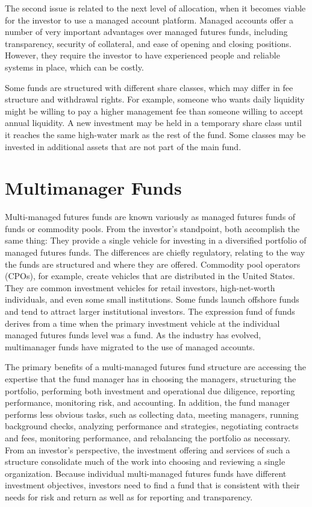\documentclass[11pt]{article}
\begin{document}
The second issue is related to the next level of allocation, when it becomes viable for the investor to use a managed account platform. Managed accounts offer a number of very important advantages over managed futures funds, including transparency, security of collateral, and ease of opening and closing positions. However, they require the investor to have experienced people and reliable systems in place, which can be costly.

Some funds are structured with different share classes, which may differ in fee structure and withdrawal rights. For example, someone who wants daily liquidity might be willing to pay a higher management fee than someone willing to accept annual liquidity. A new investment may be held in a temporary share class until it reaches the same high-water mark as the rest of the fund. Some classes may be invested in additional assets that are not part of the main fund.

\section*{Multimanager Funds}
Multi-managed futures funds are known variously as managed futures funds of funds or commodity pools. From the investor's standpoint, both accomplish the same thing: They provide a single vehicle for investing in a diversified portfolio of managed futures funds. The differences are chiefly regulatory, relating to the way the funds are structured and where they are offered. Commodity pool operators (CPOs), for example, create vehicles that are distributed in the United States. They are common investment vehicles for retail investors, high-net-worth individuals, and even some small institutions. Some funds launch offshore funds and tend to attract larger institutional investors. The expression fund of funds derives from a time when the primary investment vehicle at the individual managed futures funds level was a fund. As the industry has evolved, multimanager funds have migrated to the use of managed accounts.

The primary benefits of a multi-managed futures fund structure are accessing the expertise that the fund manager has in choosing the managers, structuring the portfolio, performing both investment and operational due diligence, reporting performance, monitoring risk, and accounting. In addition, the fund manager performs less obvious tasks, such as collecting data, meeting managers, running background checks, analyzing performance and strategies, negotiating contracts and fees, monitoring performance, and rebalancing the portfolio as necessary. From an investor's perspective, the investment offering and services of such a structure consolidate much of the work into choosing and reviewing a single organization. Because individual multi-managed futures funds have different investment objectives, investors need to find a fund that is consistent with their needs for risk and return as well as for reporting and transparency.
\end{document}
